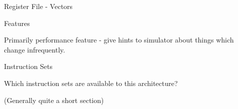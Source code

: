 \begin{frame}{Register File - Vectors}

\centering
{}

\end{frame}

\begin{frame}{Features}

Primarily performance feature - give hints to simulator about things 
which change infrequently.

\end{frame}

\begin{frame}{Instruction Sets}

Which instruction sets are available to this architecture?

(Generally quite a short section)

\end{frame}
